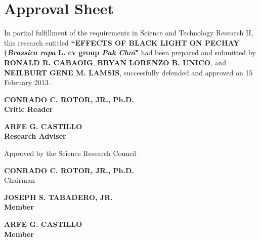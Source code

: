 \chapter{Approval Sheet}

{\singlespacing
In partial fulfillment of the requirements in Science and Technology Research II, 
this research entitled \textbf{``EFFECTS OF BLACK LIGHT ON PECHAY (\textit{Brassica rapa} 
L. cv group \textit{Pak Choi}"} had been prepared and submitted by \textbf{RONALD R. CABAOIG}, 
\textbf{BRYAN LORENZO B. UNICO}, and \textbf{NEILBURT GENE M. LAMSIS}, successfully 
defended and approved on 15 February 2013.}

\vfill

\noindent
\begin{minipage}{0.5\textwidth}%
\begin{center}
\bfseries
CONRADO C. ROTOR, JR., Ph.D.\\
Critic Reader
\end{center}
\end{minipage}%
\begin{minipage}{0.5\textwidth}%
\begin{center}
\bfseries
ARFE G. CASTILLO\\
Research Adviser
\end{center}
\end{minipage}%

\vfill

\begin{center}
Approved by the Science Research Council
\end{center}

\vfill

\begin{center}
\textbf{CONRADO C. ROTOR, JR., Ph.D.}\\
Chairman
\end{center}

\vfill

\noindent
\begin{minipage}{0.5\textwidth}%
\begin{center}
\bfseries
JOSEPH S. TABADERO, JR.\\
Member
\end{center}
\end{minipage}%
\begin{minipage}{0.5\textwidth}%
\begin{center}
\bfseries
ARFE G. CASTILLO\\
Member
\end{center}
\end{minipage}%

